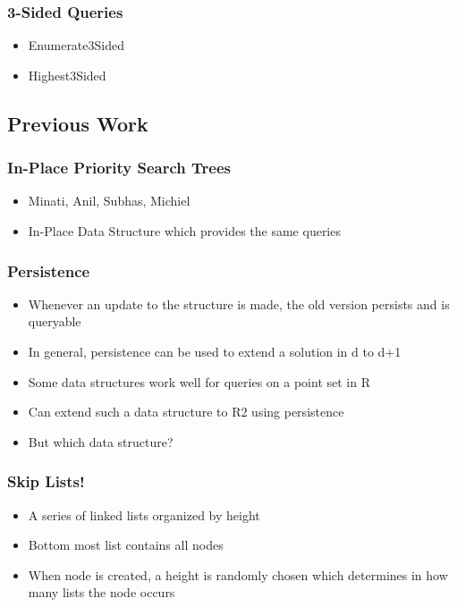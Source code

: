 \documentclass{beamer}
\begin{document}
\begin{frame}
  \frametitle{3-Sided Queries}

  \begin{itemize}
  \item
    Enumerate3Sided
  \item
    Highest3Sided
  \end{itemize}

\end{frame}

\subsection{Previous Work}

\begin{frame}
  \frametitle{In-Place Priority Search Trees}

  \begin{itemize}
  \item
    Minati, Anil, Subhas, Michiel
  \item
    In-Place Data Structure which provides the same queries
  \end{itemize}

\end{frame}

\begin{frame}
  \frametitle{Persistence}

  \begin{itemize}
  \item
    Whenever an update to the structure is made, the old version persists
    and is queryable
  \item
    In general, persistence can be used to extend a solution in d to d+1
  \item
    Some data structures work well for queries on a point set in R
  \item
    Can extend such a data structure to R2 using persistence
  \item
    But which data structure?
  \end{itemize}

\end{frame}

\begin{frame}
  \frametitle{Skip Lists!}

  \begin{itemize}
  \item
    A series of linked lists organized by height
  \item
    Bottom most list contains all nodes
  \item
    When node is created, a height is randomly chosen which determines in
    how many lists the node occurs
  \end{itemize}

\end{frame}
\end{document}
